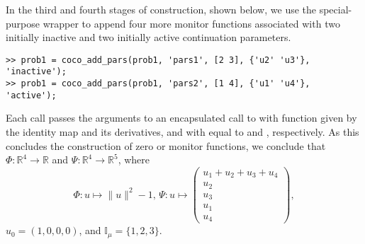 In the third and fourth stages of construction, shown below, we use the  special-purpose wrapper to append four more monitor functions associated with two initially inactive and two initially active continuation parameters.
\begin{lstlisting}[language=coco-highlight]
>> prob1 = coco_add_pars(prob1, 'pars1', [2 3], {'u2' 'u3'}, 'inactive');
>> prob1 = coco_add_pars(prob1, 'pars2', [1 4], {'u1' 'u4'}, 'active');
\end{lstlisting}
Each call passes the arguments to an encapsulated call to  with function given by the identity map and its derivatives, and with  equal to \mcode{[2 3]} and \mcode{[1 4]}, respectively. As this concludes the construction of zero or monitor functions, we conclude that $\Phi:\mathbb{R}^4\rightarrow\mathbb{R}$ and $\Psi:\mathbb{R}^4\rightarrow\mathbb{R}^5$, where
\begin{equation}
\Phi:u\mapsto\|u\|^2-1,\,\Psi:u\mapsto\left(\begin{array}{c}u_1+u_2+u_3+u_4\\u_2\\u_3\\u_1\\u_4\end{array}\right),
\end{equation}
$u_0=(1,0,0,0)$, and $\mathbb{I}_\mu=\{1,2,3\}$.

